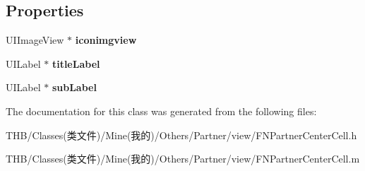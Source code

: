 \subsection*{Properties}
\begin{DoxyCompactItemize}
\item 
\mbox{\label{interface_f_n_partner_center_cell_a4991a30ca5332c35518fd99c9d4e0a47}} 
U\+I\+Image\+View $\ast$ {\bfseries iconimgview}
\item 
\mbox{\label{interface_f_n_partner_center_cell_acd2de9e6d214da281c8cd3b21f054066}} 
U\+I\+Label $\ast$ {\bfseries title\+Label}
\item 
\mbox{\label{interface_f_n_partner_center_cell_a83dfb19a0574d71d5052e26d97197841}} 
U\+I\+Label $\ast$ {\bfseries sub\+Label}
\end{DoxyCompactItemize}


The documentation for this class was generated from the following files\+:\begin{DoxyCompactItemize}
\item 
T\+H\+B/\+Classes(类文件)/\+Mine(我的)/\+Others/\+Partner/view/F\+N\+Partner\+Center\+Cell.\+h\item 
T\+H\+B/\+Classes(类文件)/\+Mine(我的)/\+Others/\+Partner/view/F\+N\+Partner\+Center\+Cell.\+m\end{DoxyCompactItemize}
